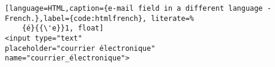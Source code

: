


\begin{lstlisting}[language=HTML,caption={e-mail field in a different language - French.},label={code:htmlfrench}, literate=%
	{é}{{\'e}}1, float]
<input type="text" 
placeholder="courrier électronique"
name="courrier_électronique">
\end{lstlisting}

